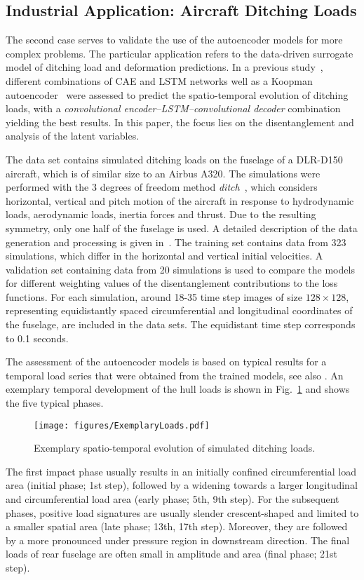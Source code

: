 \subsection{Industrial Application: Aircraft Ditching Loads}
The second case serves to validate the use of the autoencoder models for more complex problems.  The particular application refers to the data-driven surrogate model of ditching load and deformation predictions. In a previous study~\cite{schwarz:2024}, different combinations of CAE and LSTM networks well as a Koopman autoencoder~\cite{lusch:2018} were assessed to predict the spatio-temporal evolution of ditching loads, with a \textit{convolutional encoder--LSTM--convolutional decoder} combination yielding the best results. In this paper, the focus lies on the disentanglement and analysis of the latent variables. 

The data set contains simulated ditching loads on the fuselage of a DLR-D150 aircraft, which is of similar size to an Airbus A320. The simulations were performed with the 3 degrees of freedom method \emph{ditch}~\cite{bensch:2003}, which considers horizontal, vertical and pitch motion of the aircraft in response to hydrodynamic loads, aerodynamic loads, inertia forces and thrust. Due to the resulting symmetry, only one half of the fuselage is used. A detailed description of the data generation and processing is given in~\cite{schwarz:2024}. 
The training set contains data from 323 simulations, which differ in the horizontal and vertical initial velocities. A validation set containing data from 20 simulations is used to compare the models for different weighting values of the disentanglement contributions to the loss functions.
For each simulation, around 18-35 time step images of size $128\times 128$, representing equidistantly spaced circumferential and longitudinal coordinates of the fuselage, are included in the data sets. The equidistant time step corresponds to 0.1 seconds.

The assessment of the autoencoder models is based on typical results for a temporal load series that were obtained from the trained models, see also \cite{schwarz:2024}. An exemplary temporal development of the hull loads is shown in Fig.~\ref{fig:examplary_ditching_loads} and shows the five typical phases. 
%
\begin{figure}[h!]
    \centering
    \texttt{[image: figures/ExemplaryLoads.pdf]}
    \caption{Exemplary spatio-temporal evolution of simulated ditching loads.}
    \label{fig:examplary_ditching_loads}
\end{figure}
%
The first impact phase usually results in an initially  confined  circumferential load area (initial phase; 1st step), followed by a widening towards a larger longitudinal and circumferential load area (early phase; 5th, 9th step). For the subsequent phases, positive load signatures are usually slender crescent-shaped and limited to a smaller spatial area (late phase; 13th, 17th step). Moreover, they are followed by a more pronounced under pressure region in downstream direction. The final loads of rear fuselage are often small in amplitude and area (final phase; 21st step).


